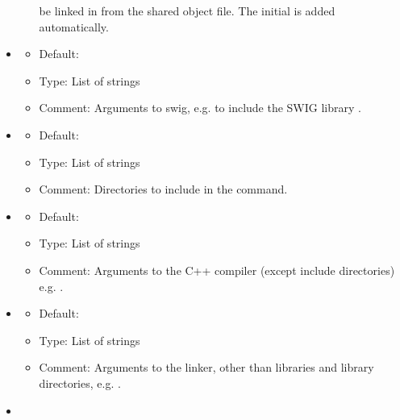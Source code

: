 \begin{itemize}
\begin{itemize}
      be linked in from the shared object file. The initial  is added
      automatically.
  \end{itemize}
\item {}
  \begin{itemize}
    \item Default: 
    \item Type: List of strings
    \item Comment: Arguments to swig, e.g. \emp{["-lpointers.i"]}
      to include the SWIG library .
  \end{itemize}
\item {}
  \begin{itemize}
    \item Default: \emp{[]}
    \item Type: List of strings
    \item Comment: Directories to include in the  command.
  \end{itemize}
\item {}
  \begin{itemize}
    \item Default: \emp{["-O2"]}
    \item Type: List of strings
    \item Comment: Arguments to the C++ compiler (except include
      directories) e.g. .
  \end{itemize}
\item {}
  \begin{itemize}
    \item Default: \emp{[]}
    \item Type: List of strings
    \item Comment: Arguments to the linker, other than libraries and library
      directories, e.g. \emp{["-E", "-U"]}.
  \end{itemize}
\item {}
  \begin{itemize}

\end{itemize}
\end{itemize}
